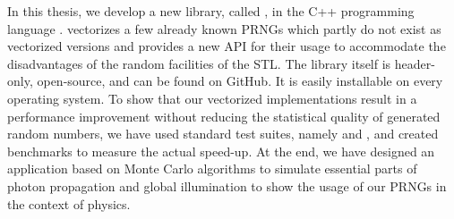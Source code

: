 \documentclass{stdlocal}
\begin{document}
In this thesis, we develop a new library, called , in the C++ programming language .
 vectorizes a few already known PRNGs which partly do not exist as vectorized versions and provides a new API for their usage to accommodate the disadvantages of the random facilities of the STL.
The library itself is header-only, open-source, and can be found on GitHub.
It is easily installable on every operating system.
To show that our vectorized implementations result in a performance improvement without reducing the statistical quality of generated random numbers, we have used standard test suites, namely  and , and created benchmarks to measure the actual speed-up.
At the end, we have designed an application based on Monte Carlo algorithms to simulate essential parts of photon propagation and global illumination to show the usage of our PRNGs in the context of physics.
\autocite{dieharder,testu01-lib,testu01}

\end{document}
